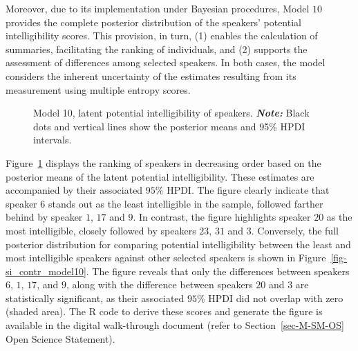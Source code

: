 \documentclass[
  authoryear,
  preprint,
  1p]{elsarticle}
\begin{document}
Moreover, due to its implementation under Bayesian procedures, Model
\(10\) provides the complete posterior distribution of the speakers'
potential intelligibility scores. This provision, in turn, (1) enables
the calculation of summaries, facilitating the ranking of individuals,
and (2) supports the assessment of differences among selected speakers.
In both cases, the model considers the inherent uncertainty of the
estimates resulting from its measurement using multiple entropy scores.

\label{cell-fig-rq2-si-model10}
\begin{figure}[H]


\caption{\label{fig-rq2-si-model10}Model 10, latent potential
intelligibility of speakers. {\textbf{\emph{Note:}} Black dots and
vertical lines show the posterior means and 95\% HPDI intervals.}}

\end{figure}%

{Figure~\ref{fig-rq2-si-model10} displays the ranking of speakers in
decreasing order based on the posterior means of the latent potential
intelligibility. These estimates are accompanied by their associated
\(95\%\) HPDI.} The figure clearly indicate that speaker \(6\) stands
out as the least intelligible in the sample, followed farther behind by
speaker \(1\), \(17\) and \(9\). In contrast, the figure highlights
speaker \(20\) as the most intelligible, closely followed by speakers
\(23\), \(31\) and \(3\). {Conversely, the full posterior distribution
for comparing potential intelligibility between the least and most
intelligible speakers against other selected speakers is shown in
Figure~\ref{fig-si_contr_model10}.} The figure reveals that only the
differences between speakers \(6\), \(1\), \(17\), and \(9\), along with
the difference between speakers \(20\) and \(3\) are statistically
significant, as their associated \(95\%\) HPDI did not overlap with zero
(shaded area). The R code to derive these scores and generate the figure
is available in the digital walk-through document (refer to
Section~\ref{sec-M-SM-OS} Open Science Statement).
\end{document}
